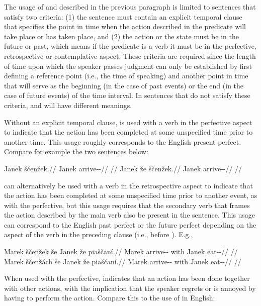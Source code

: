 The usage of  and  described in the previous paragraph is
limited to sentences that satisfy two criteria: (1) the sentence must contain an
explicit temporal clause that specifies the point in time when the action
described in the predicate will take place or has taken place, and (2) the
action or the state must be in the future or past, which means if the predicate
is a verb it must be in the perfective, retrospective or contemplative aspect.
These criteria are required since the length of time upon which the speaker
passes judgment can only be established by first defining a reference point
(i.e., the time of speaking) and another point in time that will serve as the
beginning (in the case of past events) or the end (in the case of future events)
of the time interval. In sentences that do not satisfy these criteria, 
and  will have different meanings.

Without an explicit temporal clause,  is used with a verb in the
perfective aspect to indicate that the action has been completed at some
unspecified time prior to another time. This usage roughly corresponds to the
English present perfect. Compare for example the two sentences below:

\pex
\a
\begingl
	\gla Janek ščenžek.//
	\glb Janek arrive-\Av{}-\Pf{}//
	\glft {}//
\endgl
\a
\begingl
	\gla Janek že ščenžek.//
	\glb Janek \Pfv{} arrive-\Av{}-\Pf{}//
	\glft {}//
\endgl
\xe

 can alternatively be used with a verb in the retrospective aspect to
indicate that the action has been completed at some unspecified time prior to
another event, as with the perfective, but this usage requires that the
secondary verb that frames the action described by the main verb also be present
in the sentence. This usage can correspond to the English past perfect or the
future perfect depending on the aspect of the verb in the preceding clause
(i.e., before ). E.g.,

\pex
\a
\begingl
	\gla Marek ščenžek še Janek že piaščaní.//
	\glb Marek arrive-\Av{}-\Pf{} with Janek \Pfv{} eat-\Av{}-\Ret{}//
	\glft {}//
\endgl
\a
\begingl
	\gla Marek ščenžách še Janek že piaščaní.//
	\glb Marek arrive-\Av{}-\Ctp{} with Janek \Pfv{} eat-\Av{}-\Ret{}//
	\glft {}//
\endgl
\xe

When used with the perfective,  indicates that an action has been done
together with other actions, with the implication that the speaker regrets or is
annoyed by having to perform the action. Compare this to the use of 
in English:

